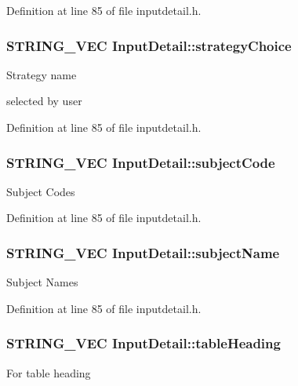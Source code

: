 Definition at line 85 of file inputdetail.\-h.

\hypertarget{classInputDetail_acbdbb6ecb850dec574b5878764c56c88}{
\subsubsection[{strategy\-Choice}]{\setlength{\rightskip}{0pt plus 5cm}S\-T\-R\-I\-N\-G\-\_\-\-V\-E\-C Input\-Detail\-::strategy\-Choice\hspace{0.3cm}{\ttfamily [protected]}}}\label{classInputDetail_acbdbb6ecb850dec574b5878764c56c88}
\begin{DoxyVerb}                      Strategy name 
\end{DoxyVerb}
 selected by user 

Definition at line 85 of file inputdetail.\-h.

\hypertarget{classInputDetail_ab391f03f242defb952e24a584eefdb35}{
\subsubsection[{subject\-Code}]{\setlength{\rightskip}{0pt plus 5cm}S\-T\-R\-I\-N\-G\-\_\-\-V\-E\-C Input\-Detail\-::subject\-Code\hspace{0.3cm}{\ttfamily [protected]}}}\label{classInputDetail_ab391f03f242defb952e24a584eefdb35}
Subject Codes 

Definition at line 85 of file inputdetail.\-h.

\hypertarget{classInputDetail_a860676e6e8b258a4cf6265e693194e93}{
\subsubsection[{subject\-Name}]{\setlength{\rightskip}{0pt plus 5cm}S\-T\-R\-I\-N\-G\-\_\-\-V\-E\-C Input\-Detail\-::subject\-Name\hspace{0.3cm}{\ttfamily [protected]}}}\label{classInputDetail_a860676e6e8b258a4cf6265e693194e93}
Subject Names 

Definition at line 85 of file inputdetail.\-h.

\hypertarget{classInputDetail_a9adc25a6c332855ee0c2dbd5fd71ca86}{
\subsubsection[{table\-Heading}]{\setlength{\rightskip}{0pt plus 5cm}S\-T\-R\-I\-N\-G\-\_\-\-V\-E\-C Input\-Detail\-::table\-Heading\hspace{0.3cm}{\ttfamily [protected]}}}\label{classInputDetail_a9adc25a6c332855ee0c2dbd5fd71ca86}
For table heading 

